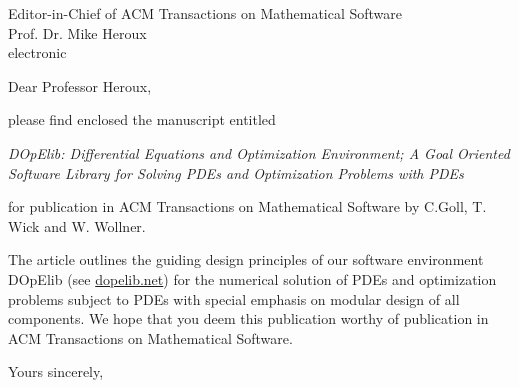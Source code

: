 \documentclass{uhhbrief-fak6}    %
\date{\today}
\begin{document}
\begin{letter}{Editor-in-Chief of ACM Transactions on Mathematical Software\\Prof. Dr. Mike Heroux\\[\baselineskip]
    electronic}

\subject{Paper Submission}

\opening{Dear Professor Heroux,}

please find enclosed the manuscript entitled

{\em DOpElib: Differential Equations and Optimization Environment; A Goal Oriented Software Library for Solving PDEs and Optimization Problems with PDEs}

for publication in ACM Transactions on Mathematical Software by
C.Goll, T. Wick and W. Wollner.

The article outlines the guiding design principles of our software environment
DOpElib (see \url{dopelib.net}) for the numerical solution of PDEs and optimization problems subject 
to PDEs with special emphasis on modular design of all components. 
We hope that you deem this publication worthy of publication in ACM Transactions on Mathematical Software.

\closing{Yours sincerely,}




\end{letter}
\end{document}
